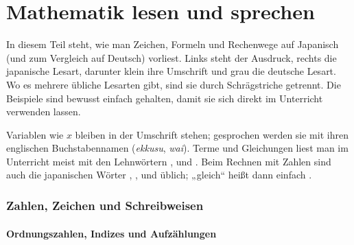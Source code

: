 \newpage
\part{Mathematik lesen und sprechen}

In diesem Teil steht, wie man Zeichen, Formeln und Rechenwege auf Japanisch (und zum Vergleich auf
Deutsch) vorliest. Links steht der Ausdruck, rechts die japanische Lesart, darunter klein ihre
Umschrift und grau die deutsche Lesart. Wo es mehrere übliche Lesarten gibt, sind sie durch
Schrägstriche getrennt. Die Beispiele sind bewusst einfach gehalten, damit sie sich direkt im
Unterricht verwenden lassen.

\smallskip
Variablen wie $x$ bleiben in der Umschrift stehen; gesprochen werden sie mit ihren englischen
Buchstabennamen (\textit{ekkusu}, \textit{wai}). Terme und Gleichungen liest man im Unterricht meist
mit den Lehnwörtern ,  und . Beim Rechnen
mit Zahlen sind auch die japanischen Wörter , ,  und
 üblich; „gleich“ heißt dann einfach .

\section{Zahlen, Zeichen und Schreibweisen}

\subsection*{Ordnungszahlen, Indizes und Aufzählungen}

\begin{lesen}
\end{lesen}

